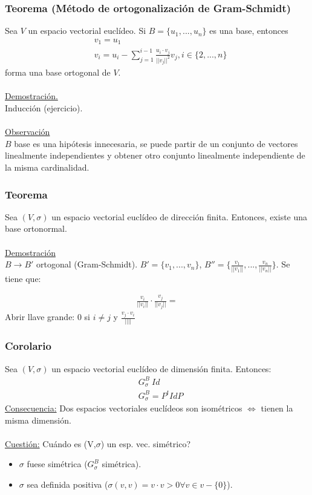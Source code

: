 \documentclass[12pt, a4paper, ones, notitlepage, openany,titlepage]{article}
\begin{document}
\subsubsection{Teorema (Método de ortogonalización de Gram-Schmidt)}
Sea $V$ un espacio vectorial euclídeo. Si $B = \{u_1,...,u_n\}$ es una base, entonces
\begin{align*}
	&v_1 = u_1 \\
	&v_i = u_i - \sum_{j=1}^{i-1} \frac{u_i \cdot v_j}{||v_j||^2} v_j, i \in \{2,...,n\}
\end{align*}
forma una base ortogonal de $V$.\\\\
\underline{Demostración.}\\
Inducción (ejercicio).\\\\
\underline{Observación}\\
$B$ base es una hipótesis innecesaria, se puede partir de un conjunto de vectores linealmente independientes y obtener otro conjunto linealmente independiente de la misma cardinalidad.

\subsubsection{Teorema}
Sea $(V,\sigma)$ un espacio vectorial euclídeo de dirección finita. Entonces, existe una base ortonormal.\\\\
\underline{Demostración}\\
$B \longrightarrow B'$ ortogonal (Gram-Schmidt). $B'=\{v_1,...,v_n\}$, $B''=\{\frac{v_1}{||v_1||},...,\frac{v_n}{||v_n||}\}$. Se tiene que:

\begin{align*}
	\frac{v_i}{||v_i||} \cdot \frac{v_j}{||v_j||} =
\end{align*}
Abrir llave grande: $0$ si $i \ne j$ y $\frac{v_j \cdot v_i}{||||}$

\subsubsection{Corolario}
Sea $(V,\sigma)$ un espacio vectorial euclídeo de dimensión finita. Entonces:
\begin{align*}
	& G_\sigma^B ~ Id \\
	& G_\sigma^B = P^tIdP
\end{align*}
\underline{Consecuencia:} Dos espacios vectoriales euclídeos son isométricos $\Longleftrightarrow$ tienen la misma dimensión.\\\\
\underline{Cuestión:} Cuándo es (V,$\sigma$) un esp. vec. simétrico?
\begin{itemize}
	\item $\sigma$ fuese simétrica ($G_\sigma^B$ simétrica).
	\item $\sigma$ sea definida positiva ($\sigma(v,v)=v \cdot v > 0 \forall v \in v - \{0\}$).
\end{itemize}
\end{document}
